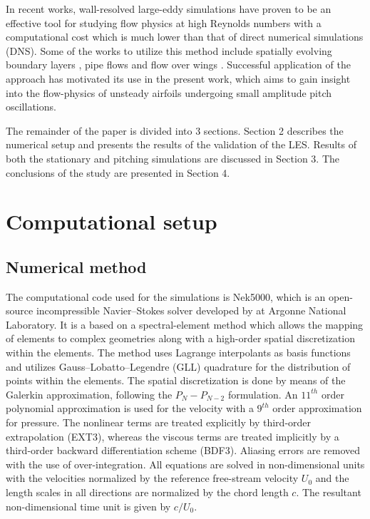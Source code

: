 In recent works, wall-resolved large-eddy simulations have proven to be an effective tool for studying flow physics at high Reynolds numbers with a computational cost which is much lower than that of direct numerical simulations (DNS). Some of the works to utilize this method include spatially evolving boundary layers \citep{eitel14}, pipe flows \citep{chin15} and flow over wings \citep{uzun10,lombard15}. Successful application of the approach has motivated its use in the present work, which aims to gain insight into the flow-physics of unsteady airfoils undergoing small amplitude pitch oscillations.

The remainder of the paper is divided into 3 sections. Section 2 describes the numerical setup and presents the results of the validation of the LES. Results of both the stationary and pitching simulations are discussed in Section 3. The conclusions of the study are presented in Section 4.

\section{Computational setup}

\subsection{Numerical method}

The computational code used for the simulations is Nek5000, which is an open-source incompressible Navier--Stokes solver developed by \cite{nek5000} at Argonne National Laboratory. It is a based on a spectral-element method which allows the mapping of elements to complex geometries along with a high-order spatial discretization within the elements. The method uses Lagrange interpolants as basis functions and utilizes Gauss--Lobatto--Legendre (GLL) quadrature for the distribution of points within the elements. The spatial discretization is done by means of the Galerkin approximation, following the $P_{N}-P_{N-2}$ formulation. An $11^{th}$ order polynomial approximation is used for the velocity with a $9^{th}$ order approximation for pressure. The nonlinear terms are treated explicitly by third-order extrapolation (EXT3), whereas the viscous terms are treated implicitly by a third-order backward differentiation scheme (BDF3). Aliasing errors are removed with the use of over-integration. All equations are solved in non-dimensional units with the velocities normalized by the reference free-stream velocity $U_{0}$ and the length scales in all directions are normalized by the chord length $c$. The resultant non-dimensional time unit is given by $c/U_{0}$.
